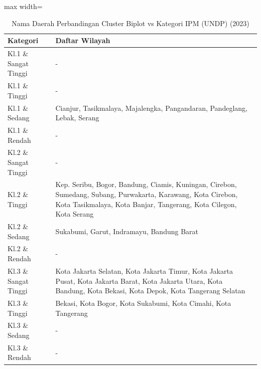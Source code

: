 \begin{table}[H]
\centering
\caption{Nama Daerah Perbandingan Cluster Biplot vs Kategori IPM (UNDP) (2023)} \label{tab:appcrossname2023}
\begin{adjustbox}{max width=\textwidth}
\begin{tabular}{|p{4cm}|p{10cm}|}
\hline
\textbf{Kategori} & \textbf{Daftar Wilayah} \\
\hline
Kl.1 \& Sangat Tinggi & - \\
\hline
Kl.1 \& Tinggi & - \\
\hline
Kl.1 \& Sedang & Cianjur, Tasikmalaya, Majalengka, Pangandaran, Pandeglang, Lebak, Serang \\
\hline
Kl.1 \& Rendah & - \\
\hline
Kl.2 \& Sangat Tinggi & - \\
\hline
Kl.2 \& Tinggi & Kep. Seribu, Bogor, Bandung, Ciamis, Kuningan, Cirebon, Sumedang, Subang, Purwakarta, Karawang, Kota Cirebon, Kota Tasikmalaya, Kota Banjar, Tangerang, Kota Cilegon, Kota Serang \\
\hline
Kl.2 \& Sedang & Sukabumi, Garut, Indramayu, Bandung Barat \\
\hline
Kl.2 \& Rendah & - \\
\hline
Kl.3 \& Sangat Tinggi & Kota Jakarta Selatan, Kota Jakarta Timur, Kota Jakarta Pusat, Kota Jakarta Barat, Kota Jakarta Utara, Kota Bandung, Kota Bekasi, Kota Depok, Kota Tangerang Selatan \\
\hline
Kl.3 \& Tinggi & Bekasi, Kota Bogor, Kota Sukabumi, Kota Cimahi, Kota Tangerang \\
\hline
Kl.3 \& Sedang & - \\
\hline
Kl.3 \& Rendah & - \\
\hline
\end{tabular}
\end{adjustbox}
\end{table}